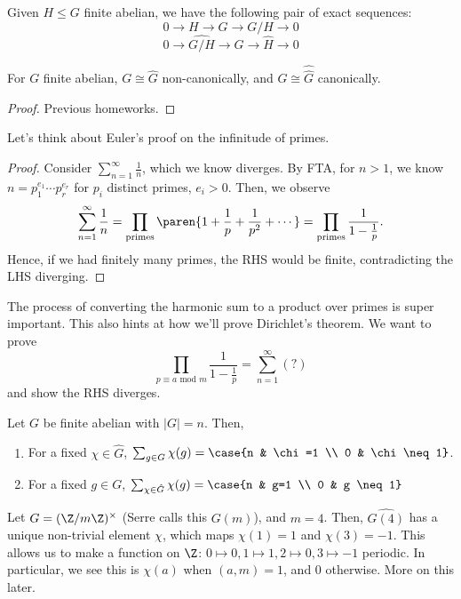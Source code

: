 \begin{prop}
    Given $H \leq G$ finite abelian, we have the following pair of exact sequences:
    $$0 \to H \to G \to G/H \to 0$$
    $$ 0 \to \widehat{G/H} \to \hat G \to \hat H \to 0$$
\end{prop}

\begin{prop}
    For $G$ finite abelian, $G \cong \hat G$ non-canonically, and $G \cong \hat{\hat G}$ canonically.
\end{prop}

\begin{proof}
    Previous homeworks.
\end{proof}

Let's think about Euler's proof on the infinitude of primes.

\begin{proof}
    Consider $\sum_{n=1}^\infty \frac 1n$, which we know diverges. By FTA, for $n>1$, we know $n = p_1^{e_1}\cdots p_r^{e_r}$ for $p_i$ distinct primes, $e_i >0$. Then, we observe
    $$\sum _{n=1}^\infty \frac{1}{n}=\prod_{\text{primes}}\paren{1 +\frac{1}{p}+\frac{1}{p^2}+\cdots}=\prod_{\text{primes}}\frac{1}{1-\frac{1}{p}}.$$
    Hence, if we had finitely many primes, the RHS would be finite, contradicting the LHS diverging.
\end{proof}
The process of converting the harmonic sum to a product over primes is super important. This also hints at how we'll prove Dirichlet's theorem. We want to prove
$$\prod_{p \equiv a \text{ mod } m}\frac{1}{1- \frac{1}{p}}= \sum _{n=1}^\infty(?)$$
and show the RHS diverges.

\begin{thm}
    Let $G$ be finite abelian with $|G|=n$. Then,
    \begin{enumerate}
        \item For a fixed $\chi \in \hat G$, $\sum_{g \in G}\chi (g) = \case{n  & \chi =1 \\ 0 & \chi \neq 1}$.
        \item For a fixed $g \in G$, $\sum _{\chi \in \hat G}\chi(g)=\case{n & g=1 \\ 0 & g \neq 1}$
    \end{enumerate}
\end{thm}

\begin{ex}
    Let $G = (\Z/m\Z)^\times$ (Serre calls this $G(m)$), and $m=4$. Then, $\widehat{G(4)}$ has a unique non-trivial element $\chi$, which maps $\chi(1)=1$ and $\chi (3)=-1$. This allows us to make a function on $\Z$: $0 \mapsto 0,1 \mapsto 1, 2 \mapsto 0, 3 \mapsto -1$ periodic. In particular, we see this is $\chi (a)$ when $(a,m)=1$, and $0$ otherwise. More on this later.
\end{ex}

